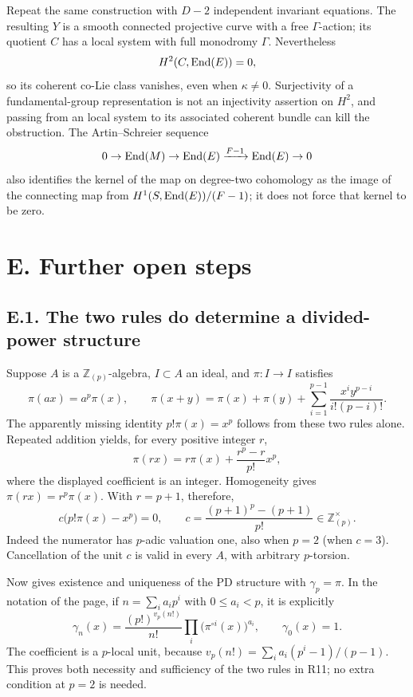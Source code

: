 \begin{remark}
Repeat the same construction with $D-2$ independent invariant equations.  The resulting $Y$ is a smooth connected projective curve with a free $\Gamma$-action; its quotient $C$ has a local system with full monodromy $\Gamma$.  Nevertheless
\[
 H^2(C,\operatorname{End}(E))=0,
\]
so its coherent co-Lie class vanishes, even when $\kappa\ne0$.  Surjectivity of a fundamental-group representation is not an injectivity assertion on $H^2$, and passing from an \etale local system to its associated coherent bundle can kill the obstruction.  The Artin--Schreier sequence
\[
 0\to\operatorname{End}(M)\to\operatorname{End}(E)\xrightarrow{F-1}\operatorname{End}(E)\to0
\]
also identifies the kernel of the map on degree-two cohomology as the image of the connecting map from $H^1(S,\operatorname{End}(E))/(F-1)$; it does not force that kernel to be zero.
\end{remark}

\section{E. Further open steps}
\subsection{E.1. The two rules do determine a divided-power structure}

Suppose $A$ is a $\mathbb Z_{(p)}$-algebra, $I\subset A$ an ideal, and $\pi:I\to I$ satisfies
\[
 \pi(ax)=a^p\pi(x),\qquad
 \pi(x+y)=\pi(x)+\pi(y)+\sum_{i=1}^{p-1}\frac{x^iy^{p-i}}{i!(p-i)!}.
\]
The apparently missing identity $p!\pi(x)=x^p$ follows from these two rules alone.  Repeated addition yields, for every positive integer $r$,
\[
 \pi(rx)=r\pi(x)+\frac{r^p-r}{p!}x^p,
\]
where the displayed coefficient is an integer.  Homogeneity gives $\pi(rx)=r^p\pi(x)$.  With $r=p+1$, therefore,
\[
 c\bigl(p!\pi(x)-x^p\bigr)=0,\qquad
 c=\frac{(p+1)^p-(p+1)}{p!}\in\mathbb Z_{(p)}^\times.
\]
Indeed the numerator has $p$-adic valuation one, also when $p=2$ (when $c=3$).  Cancellation of the unit $c$ is valid in every $A$, with arbitrary $p$-torsion.

Now \cite[Lemma~23.5.3, Tag~07GS]{StacksProject} gives existence and uniqueness of the PD structure with $\gamma_p=\pi$.  In the notation of the page, if $n=\sum_i a_ip^i$ with $0\leq a_i<p$, it is explicitly
\[
 \gamma_n(x)=\frac{(p!)^{v_p(n!)}}{n!}\prod_i\bigl(\pi^{\circ i}(x)\bigr)^{a_i},\qquad
 \gamma_0(x)=1.
\]
The coefficient is a $p$-local unit, because $v_p(n!)=\sum_i a_i(p^i-1)/(p-1)$.  This proves both necessity and sufficiency of the two rules in R11; no extra condition at $p=2$ is needed.

